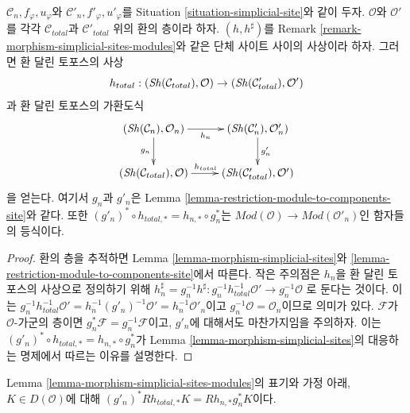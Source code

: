 \begin{lemma}
\label{lemma-morphism-simplicial-sites-modules}
$\mathcal{C}_n, f_\varphi, u_\varphi$와
$\mathcal{C}'_n, f'_\varphi, u'_\varphi$를 Situation
\ref{situation-simplicial-site}와 같이 두자.
$\mathcal{O}$와 $\mathcal{O}'$를 각각 $\mathcal{C}_{total}$과
$\mathcal{C}'_{total}$ 위의 환의 층이라 하자.
$(h, h^\sharp)$를 Remark \ref{remark-morphism-simplicial-sites-modules}와 같은
단체 사이트 사이의 사상이라 하자. 그러면 환 달린 토포스의 사상
$$
h_{total} :
(\mathop{\mathit{Sh}}\nolimits(\mathcal{C}_{total}), \mathcal{O})
\to
(\mathop{\mathit{Sh}}\nolimits(\mathcal{C}'_{total}), \mathcal{O}')
$$
과 환 달린 토포스의 가환도식
$$
\xymatrix{
(\Sh(\mathcal{C}_n), \mathcal{O}_n) \ar[d]_{g_n} \ar[r]_{h_n} &
(\Sh(\mathcal{C}'_n), \mathcal{O}'_n) \ar[d]^{g'_n} \\
(\Sh(\mathcal{C}_{total}), \mathcal{O}) \ar[r]^{h_{total}} &
(\Sh(\mathcal{C}'_{total}), \mathcal{O}')
}
$$
을 얻는다. 여기서 $g_n$과 $g'_n$은 Lemma
\ref{lemma-restriction-module-to-components-site}와 같다. 또한
$(g'_n)^* \circ h_{total, *} = h_{n, *} \circ g_n^*$는
$\textit{Mod}(\mathcal{O}) \to \textit{Mod}(\mathcal{O}'_n)$인
함자들의 등식이다.
\end{lemma}

\begin{proof}
환의 층을 추적하면 Lemma \ref{lemma-morphism-simplicial-sites}와
\ref{lemma-restriction-module-to-components-site}에서 따른다.
작은 주의점은 $h_n$을 환 달린 토포스의 사상으로 정의하기 위해
$h_n^\sharp = g_n^{-1}h^\sharp :
g_n^{-1}h_{total}^{-1}\mathcal{O}' \to g_n^{-1}\mathcal{O}$
로 둔다는 것이다. 이는\newline
$g_n^{-1}h_{total}^{-1}\mathcal{O}' =
\allowbreak h_n^{-1}(g'_n)^{-1}\mathcal{O}' =
\allowbreak h_n^{-1}\mathcal{O}'_n$이고
$g_n^{-1}\mathcal{O} = \mathcal{O}_n$이므로
의미가 있다. $\mathcal{F}$가 $\mathcal{O}$-가군의 층이면
$g_n^*\mathcal{F} = g_n^{-1}\mathcal{F}$이고, $g'_n$에 대해서도
마찬가지임을 주의하자. 이는
$(g'_n)^* \circ h_{total, *} = h_{n, *} \circ g_n^*$가
Lemma \ref{lemma-morphism-simplicial-sites}의 대응하는 명제에서
따르는 이유를 설명한다.
\end{proof}

\begin{lemma}
\label{lemma-direct-image-morphism-simplicial-sites-modules}
Lemma \ref{lemma-morphism-simplicial-sites-modules}의 표기와 가정 아래,\newline
$K \in D(\mathcal{O})$에 대해
$(g'_n)^*Rh_{total, *}K = Rh_{n, *}g_n^*K$이다.
\end{lemma}

